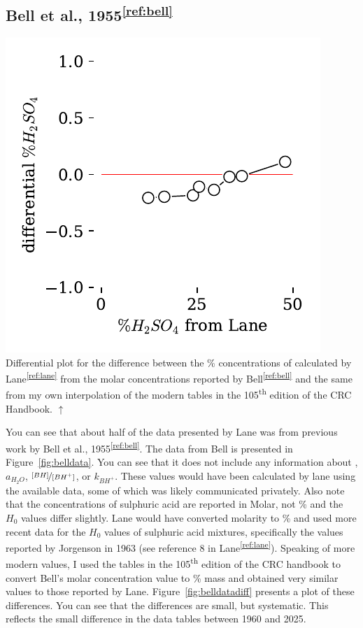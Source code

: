 \documentclass[]{tufte-handout}
\newcommand{\tss}[1]{\textsuperscript{#1}}
\begin{document}
\subsection{Bell et al., 1955\tss{\ref{ref:bell}}}

\begin{marginfigure}[0mm]
\vspace{0mm}
  \centering
  \includegraphics[scale=0.6]{images/plot4} \\
  \caption{Differential plot for the difference between the \% concentrations of  calculated by Lane\tss{\ref{ref:lane}} from the molar concentrations reported by Bell\tss{\ref{ref:bell}}  and the same from my own interpolation of the modern tables in the 105\tss{th} edition of the CRC Handbook. $\uparrow$ \vspace{3mm}}

  \label{fig:belldatadiff}
\end{marginfigure}



You can see that about half of the data presented by Lane was from previous work by Bell et al., 1955\tss{\ref{ref:bell}}. The data from Bell is presented in Figure~\vref{fig:belldata}. You can see that it does not include any information about , $a_{H_2O}$, $\nicefrac{[BH]}{[BH^+]}$, or $k_{BH^+}$. These values would have been calculated by lane using the available data, some of which was likely communicated privately. Also note that the concentrations of sulphuric acid are reported in Molar, not \% and the $H_0$ values differ slightly. Lane would have converted molarity to \% and used more recent data for the $H_0$ values of sulphuric acid mixtures, specifically the values reported by Jorgenson in 1963 (see reference 8 in Lane\tss{\ref{ref:lane}}). Speaking of more modern values, I used the tables in the 105\tss{th} edition of the CRC handbook to convert Bell's molar concentration value to \% mass and obtained very similar values to those reported by Lane. Figure~\vref{fig:belldatadiff} presents a plot of these differences. You can see that the differences are small, but systematic. This reflects the small difference in the data tables between 1960 and 2025.
\end{document}
